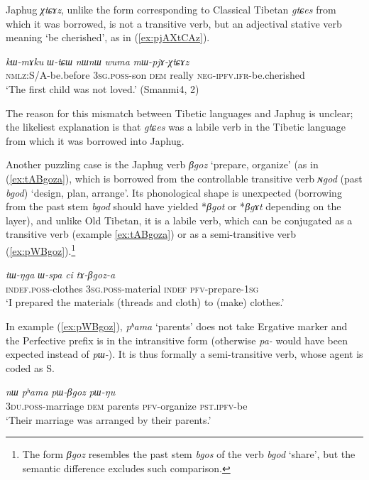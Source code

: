 \documentclass[oneside,a4paper,11pt]{article}
\newcommand{\ipa}[1]{{\phon\textit{\mbox{#1}}}} %
\newcommand{\refb}[1]{(\ref{#1})}
\begin{document}
Japhug \ipa{χtɕɤz}, unlike the form corresponding to Classical Tibetan \ipa{gtɕes} from which it was borrowed, is not a transitive verb, but an adjectival stative verb meaning `be cherished', as in \refb{ex:pjAXtCAz}. 

\begin{exe}
\ex \label{ex:pjAXtCAz}
\gll
\ipa{kɯ-mɤku} 	\ipa{ɯ-tɕɯ} 	\ipa{nɯnɯ} 	\ipa{wuma} 	\ipa{mɯ-pjɤ-χtɕɤz} \\
\textsc{nmlz}:S/A-be.before \textsc{3sg.poss}-son \textsc{dem} really \textsc{neg-ipfv.ifr}-be.cherished \\
\glt `The first child was not loved.' (Smanmi4, 2)
\end{exe}

The reason for this mismatch between Tibetic languages and Japhug is unclear; the likeliest explanation is that \ipa{gtɕes} was a labile verb in the Tibetic language from which it was borrowed into Japhug.


Another puzzling case is the Japhug verb \ipa{βgoz} `prepare, organize' (as in \refb{ex:tABgoza}, which is borrowed from the controllable transitive verb \ipa{ɴgod} (past \ipa{bgod}) `design, plan, arrange'. Its phonological shape is unexpected (borrowing from the past stem \ipa{bgod} should have yielded *\ipa{βgot} or *\ipa{βgɤt} depending on the layer), and unlike Old Tibetan, it is a labile verb, which can be conjugated as a transitive verb (example \ref{ex:tABgoza}) or as a semi-transitive verb (\ref{ex:pWBgoz}).\footnote{The form \ipa{βgoz} resembles the past stem \ipa{bgos} of the verb \ipa{bgod} `share', but the semantic difference excludes such comparison.} 



\begin{exe}
\ex \label{ex:tABgoza}
\gll
\ipa{tɯ-ŋga} 	\ipa{ɯ-spa} 	\ipa{ci} 	\ipa{tɤ-βgoz-a} \\
\textsc{indef.poss}-clothes \textsc{3sg.poss}-material \textsc{indef} \textsc{pfv}-prepare-\textsc{1sg} \\
\glt `I prepared the materials (threads and cloth) to (make) clothes.'
\end{exe}

In example \refb{ex:pWBgoz},  \ipa{pʰama} `parents' does not take Ergative marker and the Perfective prefix is in the intransitive form (otherwise \ipa{pa-} would have been expected instead of \ipa{pɯ-}). It is thus formally a semi-transitive verb, whose agent is coded as S.

\begin{exe}
\ex \label{ex:pWBgoz}
\gll \ipa{ndʑi-stɯnmɯ} 	\ipa{nɯ} 	\ipa{pʰama} 	\ipa{pɯ-βgoz} 	\ipa{pɯ-ŋu} \\
\textsc{3du.poss}-marriage \textsc{dem} parents \textsc{pfv}-organize \textsc{pst.ipfv}-be \\
\glt `Their marriage was arranged by their parents.'
\end{exe}
\end{document}
